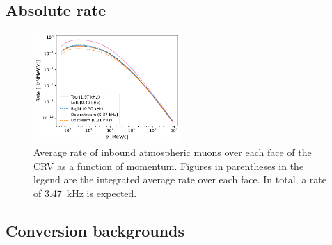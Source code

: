 \subsection{Absolute rate}

\begin{figure}
    \centering
    \includegraphics[width=0.5\textwidth]{chapter5/rate_vs_p.pdf}
    \caption{
        Average rate of inbound atmospheric muons over each face of the CRV as a
        function of momentum. Figures in parentheses in the legend are the
        integrated average rate over each face. In total, a rate of
        \SI{3.47}{\kHz} is expected.
    }
    \label{fig:avg_rate_per_face}
\end{figure}

\subsection{Conversion backgrounds}
